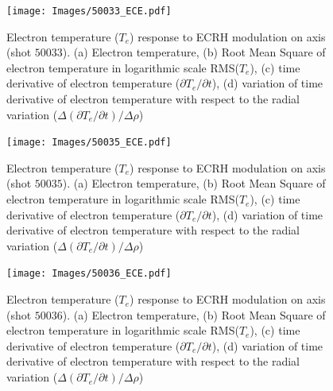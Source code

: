 \documentclass[preprint,12pt,authoryear]{elsarticle}
\begin{document}
\begin{figure}[!ht]
   \texttt{[image: Images/50033\_ECE.pdf]}
   \caption{Electron temperature ($T_e$) response to ECRH modulation on axis (shot $50033$). (a) Electron temperature, (b) Root Mean Square of electron temperature in logarithmic scale RMS($T_e$), (c) time derivative of electron temperature ($\partial T_e /\partial t $), (d) variation of time derivative of electron temperature with respect to the radial variation ($\Delta(\partial T_e /\partial t)/\Delta \rho $)}
   \label{Fig:50033_ECE}
\end{figure}

\begin{figure}[!ht]
   \texttt{[image: Images/50035\_ECE.pdf]}
   \caption{Electron temperature ($T_e$) response to ECRH modulation on axis (shot $50035$). (a) Electron temperature, (b) Root Mean Square of electron temperature in logarithmic scale RMS($T_e$), (c) time derivative of electron temperature ($\partial T_e /\partial t $), (d) variation of time derivative of electron temperature with respect to the radial variation ($\Delta(\partial T_e /\partial t)/\Delta \rho $)}
   \label{Fig:50035_ECE}
\end{figure}

\begin{figure}[!ht]
   \texttt{[image: Images/50036\_ECE.pdf]}
   \caption{Electron temperature ($T_e$) response to ECRH modulation on axis (shot $50036$). (a) Electron temperature, (b) Root Mean Square of electron temperature in logarithmic scale RMS($T_e$), (c) time derivative of electron temperature ($\partial T_e /\partial t $), (d) variation of time derivative of electron temperature with respect to the radial variation ($\Delta(\partial T_e /\partial t)/\Delta \rho $)}
   \label{Fig:50036_ECE}
\end{figure}


\clearpage




\end{document}
